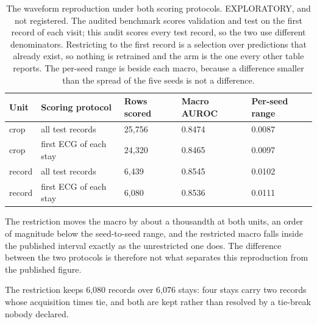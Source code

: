 \begin{table}[t]
\centering
\small
\caption{The waveform reproduction under both scoring protocols. EXPLORATORY, and not registered. The audited benchmark scores validation and test on the first record of each visit; this audit scores every test record, so the two use different denominators. Restricting to the first record is a selection over predictions that already exist, so nothing is retrained and the arm is the one every other table reports. The per-seed range is beside each macro, because a difference smaller than the spread of the five seeds is not a difference.}
\label{tab:first_ecg}
\begin{tabular}{lllll}
\toprule
Unit & Scoring protocol & Rows scored & Macro AUROC & Per-seed range \\
\midrule
crop & all test records & 25,756 & 0.8474 & 0.0087 \\
crop & first ECG of each stay & 24,320 & 0.8465 & 0.0097 \\
record & all test records & 6,439 & 0.8545 & 0.0102 \\
record & first ECG of each stay & 6,080 & 0.8536 & 0.0111 \\
\bottomrule
\end{tabular}
\par\footnotesize The restriction moves the macro by about a thousandth at both units, an order of magnitude below the seed-to-seed range, and the restricted macro falls inside the published interval exactly as the unrestricted one does. The difference between the two protocols is therefore not what separates this reproduction from the published figure.
\par\footnotesize The restriction keeps 6,080 records over 6,076 stays: four stays carry two records whose acquisition times tie, and both are kept rather than resolved by a tie-break nobody declared.
\end{table}

